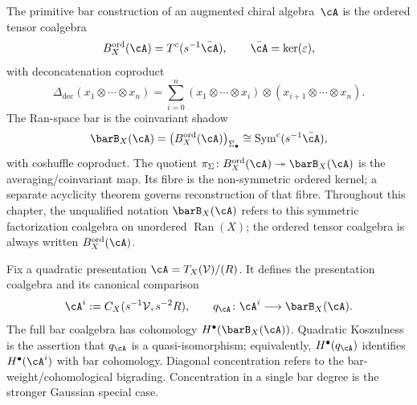 \begin{convention}
\label{conv:bar-coalgebra-identity}
The primitive bar construction of an augmented chiral algebra~$\cA$ is
the ordered tensor coalgebra
\[
B^{\mathrm{ord}}_X(\cA)=T^c(s^{-1}\bar\cA),
\qquad \bar\cA=\ker(\varepsilon),
\]
with deconcatenation coproduct
\[
\Delta_{\mathrm{dec}}(x_1\otimes\cdots\otimes x_n)
=\sum_{i=0}^{n}
(x_1\otimes\cdots\otimes x_i)\otimes
(x_{i+1}\otimes\cdots\otimes x_n).
\]
The Ran-space bar is the coinvariant shadow
\[
\barB_X(\cA)=
\bigl(B^{\mathrm{ord}}_X(\cA)\bigr)_{\Sigma_\bullet}
\cong \mathrm{Sym}^c(s^{-1}\bar\cA),
\]
with coshuffle coproduct. The quotient
$\pi_\Sigma\colon B^{\mathrm{ord}}_X(\cA)\twoheadrightarrow
\barB_X(\cA)$ is the averaging/coinvariant map.  Its fibre is the
non-symmetric ordered kernel; a separate acyclicity theorem governs
reconstruction of that fibre. Throughout this chapter, the unqualified notation
$\barB_X(\cA)$ refers to this symmetric factorization coalgebra on
unordered $\operatorname{Ran}(X)$; the ordered tensor coalgebra is
always written $B^{\mathrm{ord}}_X(\cA)$.

Fix a quadratic presentation
$\cA=T_X(\mathcal V)/(R)$.  It defines the presentation coalgebra and
its canonical comparison
\[
\cA^i:=C_X(s^{-1}\mathcal V,s^{-2}R),
\qquad
q_\cA\colon\cA^i\longrightarrow\barB_X(\cA).
\]
The full bar coalgebra has cohomology
$H^\bullet(\barB_X(\cA))$.  Quadratic Koszulness is the assertion that
$q_\cA$ is a quasi-isomorphism; equivalently,
$H^\bullet(q_\cA)$ identifies $H^\bullet(\cA^i)$ with bar cohomology.
Diagonal concentration refers to the bar-weight/cohomological
bigrading.  Concentration in a single bar degree is the stronger
Gaussian special case.


\end{convention}
